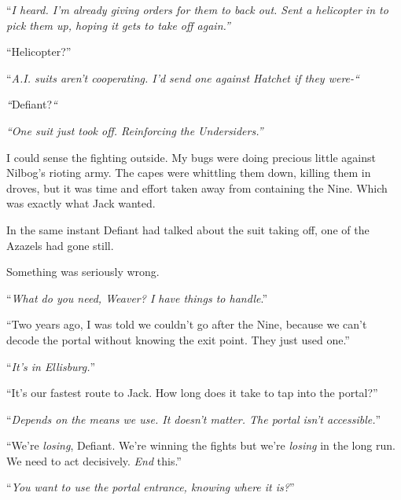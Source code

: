 ``\emph{I heard.  I'm already giving orders for them to back out.  Sent a helicopter in to pick them up, hoping it gets to take off again.''}



``Helicopter?''



``\emph{A.I. suits aren't cooperating.  I'd send one against Hatchet if they were-``}



\emph{``}Defiant?\emph{``}



\emph{``One suit just took off.  Reinforcing the Undersiders.''}



I could sense the fighting outside.  My bugs were doing precious little against Nilbog's rioting army.  The capes were whittling them down, killing them in droves, but it was time and effort taken away from containing the Nine.  Which was exactly what Jack wanted.



In the same instant Defiant had talked about the suit taking off, one of the Azazels had gone still.



Something was seriously wrong.



``\emph{What do you need, Weaver?  I have things to handle}.''



``Two years ago, I was told we couldn't go after the Nine, because we can't decode the portal without knowing the exit point.  They just used one.''



``\emph{It's in Ellisburg.}''



``It's our fastest route to Jack.  How long does it take to tap into the portal?''



``\emph{Depends on the means we use.  It doesn't matter.  The portal isn't accessible.}''



``We're \emph{losing}, Defiant.  We're winning the fights but we're \emph{losing} in the long run.  We need to act decisively.  \emph{End} this.''



``\emph{You want to use the portal entrance, knowing where it is?}''



